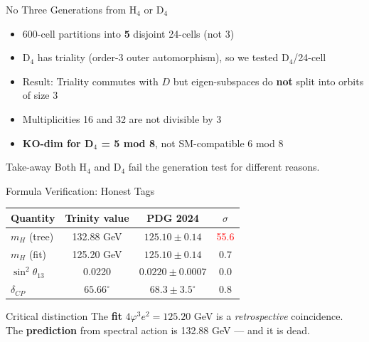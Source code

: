 \documentclass[aspectratio=169,11pt]{beamer}
\newcommand{\ph}{\varphi}
\begin{document}
\begin{frame}{No Three Generations from H$_4$ or D$_4$}
  \begin{itemize}
    \item 600-cell partitions into \textbf{5} disjoint 24-cells (not 3)
    \item D$_4$ has triality (order-3 outer automorphism), so we tested D$_4$/24-cell
    \item Result: Triality commutes with $D$ but eigen-subspaces do \textbf{not} split into orbits of size 3
    \item Multiplicities 16 and 32 are not divisible by 3
    \item \textbf{KO-dim for D$_4$ = 5 mod 8}, not SM-compatible 6 mod 8
  \end{itemize}
  \vfill
  \begin{block}{Take-away}
    Both H$_4$ and D$_4$ fail the generation test for different reasons.
  \end{block}
\end{frame}

\begin{frame}{Formula Verification: Honest Tags}
  \begin{center}
    \begin{tabular}{lccc}
      \toprule
      Quantity & Trinity value & PDG 2024 & $\sigma$ \\
      \midrule
      $m_H$ (tree) & 132.88 GeV & $125.10 \pm 0.14$ & \textcolor{red}{55.6} \\
      $m_H$ (fit) & 125.20 GeV & $125.10 \pm 0.14$ & 0.7 \\
      $\sin^2\theta_{13}$ & 0.0220 & $0.0220 \pm 0.0007$ & 0.0 \\
      $\delta_{CP}$ & $65.66^\circ$ & $68.3 \pm 3.5^\circ$ & 0.8 \\
      \bottomrule
    \end{tabular}
  \end{center}
  \vfill
  \begin{alertblock}{Critical distinction}
    The \textbf{fit} $4\ph^3 e^2 = 125.20$ GeV is a \emph{retrospective} coincidence.\\
    The \textbf{prediction} from spectral action is 132.88 GeV --- and it is dead.
  \end{alertblock}
\end{frame}
\end{document}
